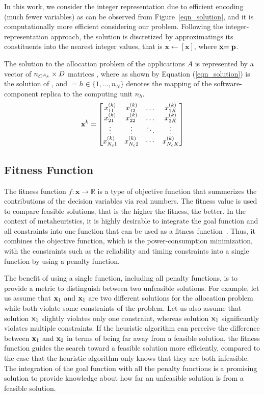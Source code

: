 In this work, we consider the integer representation due to efficient encoding (much fewer variables) as can be observed from Figure~\ref{eqn_solution}, and  it is computationally more efficient considering our problem. Following the integer-representation approach, the solution is discretized by approximatings its constituents into the nearest integer values, that is $\textbf{x}\leftarrow [\textbf{x}]$, where $\ttx=\textbf{p}$.

The solution to the allocation problem of the applications $A$ is represented by a vector of $\ssb{n}[\ssp{C}]\times D$ matrices , where \ttxsp{\ar} as shown by Equation (\ref{eqn_solution}) is the solution of \ttar, and $=h\in \{1,…,n_N\}$ denotes the mapping of the  software-component replica  to the computing unit $n_h$.
\begin{equation}
\label{eqn_solution}
\textbf{x}^{k}=
\begin{bmatrix} 
x^{(k)}_{11} & x^{(k)}_{12} & \dots & x^{(k)}_{1K}\\
x^{(k)}_{21} & x^{(k)}_{22} & \dots & x^{(k)}_{2K}\\
\vdots & \vdots & \ddots & \vdots\\
x^{(k)}_{N_c1} & x^{(k)}_{N_c2} & \cdots & x^{(k)}_{N_cK}
\end{bmatrix}
\end{equation}

\subsection{Fitness Function}
The fitness function $f:\textbf{x}\rightarrow \mathbb{R}$ is a type of objective function that summerizes the contributions of the decision variables via real numbers. The fitness value is used to compare feasible solutions, that is the higher the fitness, the better. In the context of metaheuristics, it is highly desirable to integrate the goal function and all constraints into one function that can be used as a fitness function~\cite{Talbi2009Metaheuristics:Implementation,faragardi2018AECUs}. Thus, it combines the objective function, which is the power-consumption minimization, with the constraints such as the reliability and timing constraints into a single function by using a penalty function. 

The benefit of using a single function, including all penalty functions, is to provide a metric to distinguish between two unfeasible solutions. For example, let us assume that $\textbf{x}_1$ and $\textbf{x}_1$ are two different solutions for the allocation problem while both violate
some constraints of the problem. Let us also assume that solution
$\textbf{x}_1$ slightly violates only one constraint, whereas solution
$\textbf{x}_1$ significantly violates multiple constraints. If the heuristic algorithm can perceive the difference between $\textbf{x}_1$ and $\textbf{x}_2$
in terms of being far away from a feasible solution, the fitness function guides the search toward a feasible solution more efficiently, compared to the case that the heuristic algorithm only knows that they are both infeasible. The integration of the goal function with all
the penalty functions is a promising solution to provide knowledge about how far an unfeasible solution is from a feasible
solution. 

